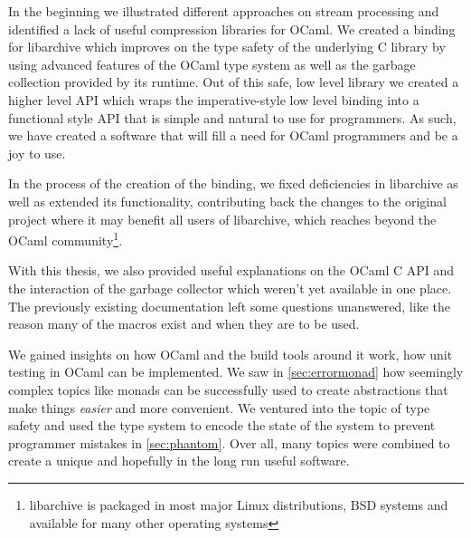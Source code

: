 \documentclass[parskip=half]{scrreprt}
\begin{document}
In the beginning we illustrated different approaches on stream processing and
identified a lack of useful compression libraries for OCaml. We created a
binding for libarchive which improves on the type safety of the underlying C
library by using advanced features of the OCaml type system as well as the
garbage collection provided by its runtime. Out of this safe, low level library
we created a higher level API which wraps the imperative-style low level
binding into a functional style API that is simple and natural to use for
programmers. As such, we have created a software that will fill a need for
OCaml programmers and be a joy to use.

In the process of the creation of the binding, we fixed deficiencies in
libarchive as well as extended its functionality, contributing back the changes
to the original project where it may benefit all users of libarchive, which
reaches beyond the OCaml community\footnote{libarchive is packaged in most
major Linux distributions, BSD systems and available for many other
operating systems}.

With this thesis, we also provided useful explanations on the OCaml C API and
the interaction of the garbage collector which weren't yet available in one
place. The previously existing documentation left some questions unanswered,
like the reason many of the macros exist and when they are to be used.

We gained insights on how OCaml and the build tools around it work, how unit
testing in OCaml can be implemented. We saw in \autoref{sec:errormonad} how
seemingly complex topics like monads can be successfully used to create
abstractions that make things \emph{easier} and more convenient. We ventured
into the topic of type safety and used the type system to encode the state of
the system to prevent programmer mistakes in \autoref{sec:phantom}. Over all,
many topics were combined to create a unique and hopefully in the long run
useful software.

\printbibliography
\end{document}
